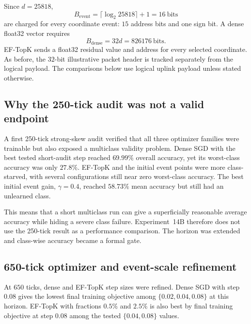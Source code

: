 Since $d=25818$,
\begin{equation}
B_{\mathrm{event}}
=\lceil\log_2 25818\rceil+1
=16\ \text{bits}
\end{equation}
are charged for every coordinate event: $15$ address bits and one sign bit. A dense float32 vector requires
\begin{equation}
B_{\mathrm{dense}}=32d=826176\ \text{bits}.
\end{equation}
EF-TopK sends a float32 residual value and address for every selected coordinate. As before, the $32$-bit illustrative packet header is tracked separately from the logical payload. The comparisons below use logical uplink payload unless stated otherwise.

\subsection{Why the 250-tick audit was not a valid endpoint}

A first 250-tick strong-skew audit verified that all three optimizer families were trainable but also exposed a multiclass validity problem. Dense SGD with the best tested short-audit step reached $69.99\%$ overall accuracy, yet its worst-class accuracy was only $27.8\%$. EF-TopK and the initial event points were more class-starved, with several configurations still near zero worst-class accuracy. The best initial event gain, $\gamma=0.4$, reached $58.73\%$ mean accuracy but still had an unlearned class.

This means that a short multiclass run can give a superficially reasonable average accuracy while hiding a severe class failure. Experiment~14B therefore does not use the 250-tick result as a performance comparison. The horizon was extended and class-wise accuracy became a formal gate.

\subsection{650-tick optimizer and event-scale refinement}

At $650$ ticks, dense and EF-TopK step sizes were refined. Dense SGD with step $0.08$ gives the lowest final training objective among $\{0.02,0.04,0.08\}$ at this horizon. EF-TopK with fractions $0.5\%$ and $2.5\%$ is also best by final training objective at step $0.08$ among the tested $\{0.04,0.08\}$ values.

